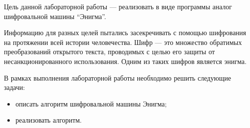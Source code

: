 \Introduction

Цель данной лабораторной работы --- реализовать в виде программы аналог шифровальной машины ``Энигма''.

Информацию для разных целей пытались засекречивать с помощью шифрования на протяжении всей истории человечества. Шифр --- это множество обратимых преобразований открытого текста, проводимых с целью его защиты от несанкционированного использования. Одним из таких шифров является энигма.

В рамках выполнения лабораторной работы необходимо решить следующие задачи: 
\begin{itemize}
	\item описать алгоритм шифровальной машины Энигма;
	\item реализовать алгоритм.
\end{itemize}